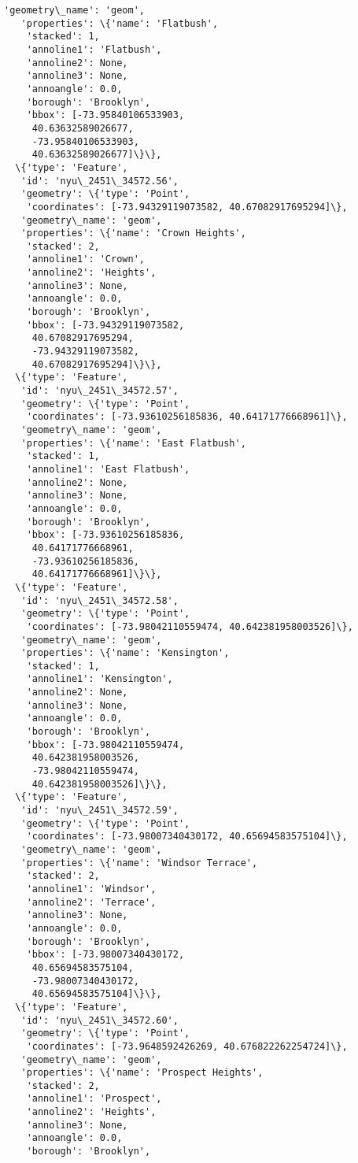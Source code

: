 \documentclass[11pt]{article}
\begin{document}
\begin{tcolorbox}[breakable, size=fbox, boxrule=.5pt, pad at break*=1mm, opacityfill=0]
\begin{Verbatim}[commandchars=\\\{\}]
   'geometry\_name': 'geom',
   'properties': \{'name': 'Flatbush',
    'stacked': 1,
    'annoline1': 'Flatbush',
    'annoline2': None,
    'annoline3': None,
    'annoangle': 0.0,
    'borough': 'Brooklyn',
    'bbox': [-73.95840106533903,
     40.63632589026677,
     -73.95840106533903,
     40.63632589026677]\}\},
  \{'type': 'Feature',
   'id': 'nyu\_2451\_34572.56',
   'geometry': \{'type': 'Point',
    'coordinates': [-73.94329119073582, 40.67082917695294]\},
   'geometry\_name': 'geom',
   'properties': \{'name': 'Crown Heights',
    'stacked': 2,
    'annoline1': 'Crown',
    'annoline2': 'Heights',
    'annoline3': None,
    'annoangle': 0.0,
    'borough': 'Brooklyn',
    'bbox': [-73.94329119073582,
     40.67082917695294,
     -73.94329119073582,
     40.67082917695294]\}\},
  \{'type': 'Feature',
   'id': 'nyu\_2451\_34572.57',
   'geometry': \{'type': 'Point',
    'coordinates': [-73.93610256185836, 40.64171776668961]\},
   'geometry\_name': 'geom',
   'properties': \{'name': 'East Flatbush',
    'stacked': 1,
    'annoline1': 'East Flatbush',
    'annoline2': None,
    'annoline3': None,
    'annoangle': 0.0,
    'borough': 'Brooklyn',
    'bbox': [-73.93610256185836,
     40.64171776668961,
     -73.93610256185836,
     40.64171776668961]\}\},
  \{'type': 'Feature',
   'id': 'nyu\_2451\_34572.58',
   'geometry': \{'type': 'Point',
    'coordinates': [-73.98042110559474, 40.642381958003526]\},
   'geometry\_name': 'geom',
   'properties': \{'name': 'Kensington',
    'stacked': 1,
    'annoline1': 'Kensington',
    'annoline2': None,
    'annoline3': None,
    'annoangle': 0.0,
    'borough': 'Brooklyn',
    'bbox': [-73.98042110559474,
     40.642381958003526,
     -73.98042110559474,
     40.642381958003526]\}\},
  \{'type': 'Feature',
   'id': 'nyu\_2451\_34572.59',
   'geometry': \{'type': 'Point',
    'coordinates': [-73.98007340430172, 40.65694583575104]\},
   'geometry\_name': 'geom',
   'properties': \{'name': 'Windsor Terrace',
    'stacked': 2,
    'annoline1': 'Windsor',
    'annoline2': 'Terrace',
    'annoline3': None,
    'annoangle': 0.0,
    'borough': 'Brooklyn',
    'bbox': [-73.98007340430172,
     40.65694583575104,
     -73.98007340430172,
     40.65694583575104]\}\},
  \{'type': 'Feature',
   'id': 'nyu\_2451\_34572.60',
   'geometry': \{'type': 'Point',
    'coordinates': [-73.9648592426269, 40.676822262254724]\},
   'geometry\_name': 'geom',
   'properties': \{'name': 'Prospect Heights',
    'stacked': 2,
    'annoline1': 'Prospect',
    'annoline2': 'Heights',
    'annoline3': None,
    'annoangle': 0.0,
    'borough': 'Brooklyn',

\end{Verbatim}
\end{tcolorbox}
\end{document}
